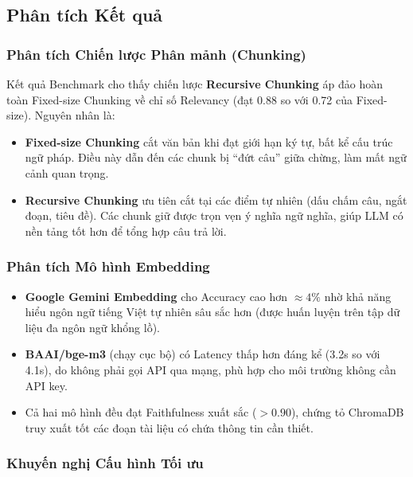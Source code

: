 \subsection{Phân tích Kết quả}

\subsubsection{Phân tích Chiến lược Phân mảnh (Chunking)}

Kết quả Benchmark cho thấy chiến lược \textbf{Recursive Chunking} áp đảo hoàn toàn Fixed-size Chunking về chỉ số Relevancy (đạt 0.88 so với 0.72 của Fixed-size). Nguyên nhân là:

\begin{itemize}[itemsep=3pt]
  \item \textbf{Fixed-size Chunking} cắt văn bản khi đạt giới hạn ký tự, bất kể cấu trúc ngữ pháp. Điều này dẫn đến các chunk bị ``đứt câu'' giữa chừng, làm mất ngữ cảnh quan trọng.
  \item \textbf{Recursive Chunking} ưu tiên cắt tại các điểm tự nhiên (dấu chấm câu, ngắt đoạn, tiêu đề). Các chunk giữ được trọn vẹn ý nghĩa ngữ nghĩa, giúp LLM có nền tảng tốt hơn để tổng hợp câu trả lời.
\end{itemize}

\subsubsection{Phân tích Mô hình Embedding}

\begin{itemize}[itemsep=3pt]
  \item \textbf{Google Gemini Embedding} cho Accuracy cao hơn $\approx 4\%$ nhờ khả năng hiểu ngôn ngữ tiếng Việt tự nhiên sâu sắc hơn (được huấn luyện trên tập dữ liệu đa ngôn ngữ khổng lồ).
  \item \textbf{BAAI/bge-m3} (chạy cục bộ) có Latency thấp hơn đáng kể (3.2s so với 4.1s), do không phải gọi API qua mạng, phù hợp cho môi trường không cần API key.
  \item Cả hai mô hình đều đạt Faithfulness xuất sắc ($> 0.90$), chứng tỏ ChromaDB truy xuất tốt các đoạn tài liệu có chứa thông tin cần thiết.
\end{itemize}

\subsubsection{Khuyến nghị Cấu hình Tối ưu}

